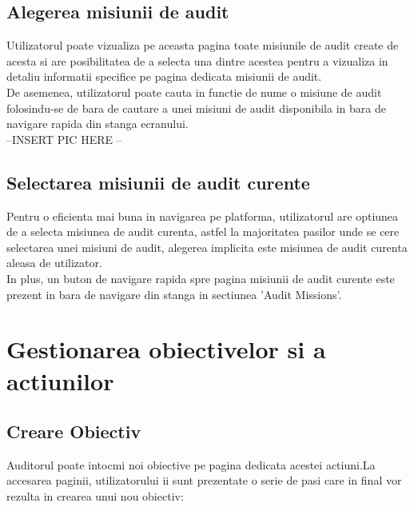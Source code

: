 \subsection*{Alegerea misiunii de audit }
Utilizatorul poate vizualiza pe aceasta pagina toate misiunile de audit create de acesta si are posibilitatea de a selecta una dintre acestea pentru a vizualiza in detaliu informatii specifice pe pagina dedicata misiunii de audit. \\
De asemenea, utilizatorul poate cauta in functie de nume o misiune de audit folosindu-se de bara de cautare a unei misiuni de audit disponibila in bara de navigare rapida din stanga ecranului.\\
--INSERT PIC HERE -- \\

\subsection*{Selectarea misiunii de audit curente}
Pentru o eficienta mai buna in navigarea pe platforma, utilizatorul are optiunea de a selecta misiunea de audit curenta, astfel la majoritatea pasilor unde se cere selectarea unei misiuni de audit, alegerea implicita este misiunea de audit  curenta aleasa de utilizator.\\
In plus, un buton de navigare rapida spre pagina misiunii de audit curente este prezent in bara de navigare din stanga in sectiunea 'Audit Missions'.

\section{Gestionarea obiectivelor si a actiunilor}

\subsection*{Creare Obiectiv}
Auditorul poate intocmi noi obiective pe pagina dedicata acestei actiuni.La accesarea paginii, utilizatorului ii sunt prezentate o serie de pasi care in final vor rezulta in crearea unui nou obiectiv:

